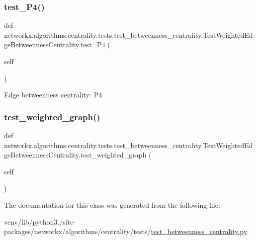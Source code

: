 \subsubsection{\texorpdfstring{test\+\_\+\+P4()}{test\_P4()}}
{\footnotesize\ttfamily def networkx.\+algorithms.\+centrality.\+tests.\+test\+\_\+betweenness\+\_\+centrality.\+Test\+Weighted\+Edge\+Betweenness\+Centrality.\+test\+\_\+\+P4 (\begin{DoxyParamCaption}\item[{}]{self }\end{DoxyParamCaption})}

\begin{DoxyVerb}Edge betweenness centrality: P4\end{DoxyVerb}
 \mbox{\label{classnetworkx_1_1algorithms_1_1centrality_1_1tests_1_1test__betweenness__centrality_1_1TestWeightedEdgeBetweennessCentrality_a837d8b66e76089145d9e71110d0d9ab1}} 
\subsubsection{\texorpdfstring{test\+\_\+weighted\+\_\+graph()}{test\_weighted\_graph()}}
{\footnotesize\ttfamily def networkx.\+algorithms.\+centrality.\+tests.\+test\+\_\+betweenness\+\_\+centrality.\+Test\+Weighted\+Edge\+Betweenness\+Centrality.\+test\+\_\+weighted\+\_\+graph (\begin{DoxyParamCaption}\item[{}]{self }\end{DoxyParamCaption})}



The documentation for this class was generated from the following file\+:\begin{DoxyCompactItemize}
\item 
venv/lib/python3./site-\/packages/networkx/algorithms/centrality/tests/\hyperlink{test__betweenness__centrality_8py}{test\+\_\+betweenness\+\_\+centrality.\+py}\end{DoxyCompactItemize}
